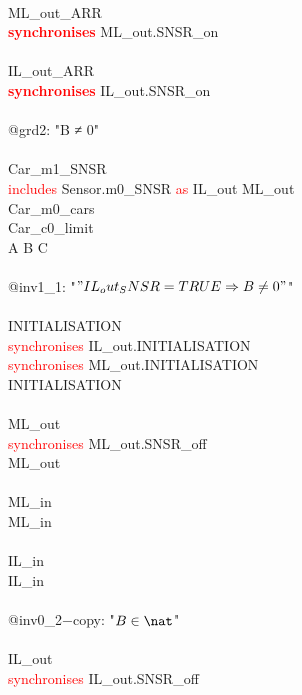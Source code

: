 \begin{description}
\begin{center}
\begin{Bcode}
			\Bend\\
			ML_out_ARR\\
			\textcolor{red}{\textbf{synchronises}} ML_out.SNSR_on\\
			\Bend\\
			IL_out_ARR\\
			\textcolor{red}{\textbf{synchronises}} IL_out.SNSR_on\\
			\Bwhen\\
			@grd2: "B ≠ 0"\\
			\Bend\\
			\Bend
			\else
			\Bmachine{} Car_m1_SNSR\\
			\textcolor{red}{includes} Sensor.m0_SNSR \textcolor{red}{as} IL_out ML_out\\
			\Brefines{} Car_m0_cars\\
			\Bsees{} Car_c0_limit\\
			\Bvariables{} A B C\\
			\Binvariants\\
			\Btab @inv1_1: "\("IL_out_SNSR = TRUE \Rightarrow B \neq 0"\)"\\
			\Bevents\\
			\Btab INITIALISATION \Bextended\\
			\Btab \textcolor{red}{synchronises} IL_out.INITIALISATION\\
            \Btab \textcolor{red}{synchronises} ML_out.INITIALISATION\\
            \Btab \Brefines{} INITIALISATION\\
			\Btab \Bend\\
			\Btab ML_out \Bextended\\
			\Btab \textcolor{red}{synchronises} ML_out.SNSR_off\\
			\Btab \Brefines{} ML_out\\
			\Btab \Bend\\
			\Btab ML_in \Bextended\\
			\Btab \Brefines{} ML_in\\
			\Btab \Bend\\
			\Btab IL_in \Bextended\\
			\Btab \Brefines{} IL_in\\
			\Btab \Bwhen\\
			\Btab \Btab @inv0_2−copy: "\(B \in \nat\)" \Btheorem\\
			\Btab \Bend\\
			\Btab IL_out\\
			\Btab \textcolor{red}{synchronises} IL_out.SNSR_off\\

\end{Bcode}
\end{center}
\end{description}
